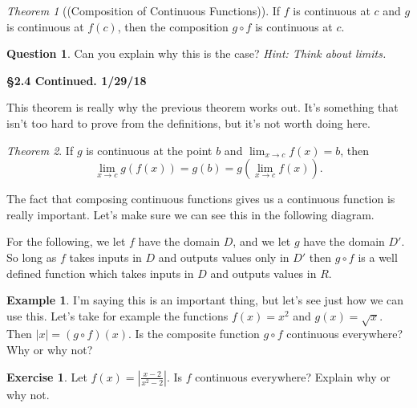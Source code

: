 \documentclass[leqno]{article}
\theoremstyle{definition}
\newtheorem{example}{Example}[section]
\newtheorem{question}{Question}[section]
\newtheorem{exercise}{Exercise}[section]
\theoremstyle{remark}
\theoremstyle{theorem}
\newtheorem{theorem}{Theorem}[section]
\begin{document}
\begin{theorem}[(Composition of Continuous Functions)]
If $f$ is continuous at $c$ and $g$ is continuous at $f(c)$, then the composition $g\circ f$ is continuous at $c$.
\end{theorem}

\begin{question}
Can you explain why this is the case? \emph{Hint: Think about limits.}
\vspace*{3cm}
\end{question}

\noindent \textbf{\Large{\S 2.4 Continued.  1/29/18}}

This theorem is really why the previous theorem works out. It's something that isn't too hard to prove from the definitions, but it's not worth doing here.   

\begin{theorem}
If $g$ is continuous at the point $b$ and $\lim_{x\to c} f(x) = b$, then 
\[
\lim_{x\to c} g(f(x))=g(b)=g\left( \lim_{x\to c} f(x)\right).
\]
\end{theorem}

The fact that composing continuous functions gives us a continuous function is really important.  Let's make sure we can see this in the following diagram. 

For the following, we let $f$ have the domain $D$, and we let $g$ have the domain $D'$.  So long as $f$ takes inputs in $D$ and outputs values only in $D'$ then $g\circ f$ is a well defined function which takes inputs in $D$ and outputs values in $R$.  
\begin{center}
\end{center}

\begin{example}
I'm saying this is an important thing, but let's see just how we can use this.  Let's take for example the functions $f(x)=x^2$ and $g(x)=\sqrt{x}$.  Then $|x|=(g\circ f) (x)$.  Is the composite function $g\circ f$ continuous everywhere?  Why or why not?
\vspace*{3cm}
\end{example}

\begin{exercise}
Let $f(x)=\left|\frac{x-2}{x^2-2}\right|$. Is $f$ continuous everywhere? Explain why or why not.
\vspace*{4cm}
\end{exercise}
\end{document}
